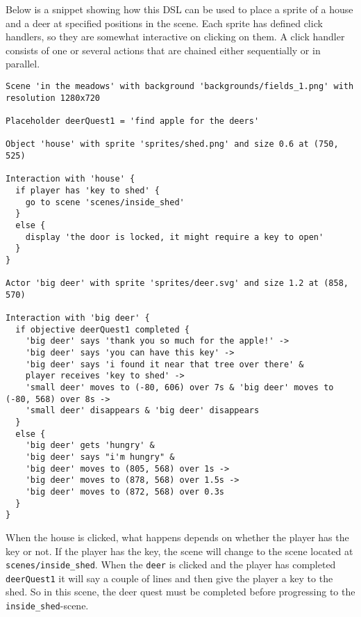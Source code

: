Below is a snippet showing how this \ac{DSL} can be used to place a sprite of a house and a deer at specified positions in the scene. Each sprite has defined click handlers, so they are somewhat interactive on clicking on them. A click handler consists of one or several actions that are chained either sequentially or in parallel.

\begin{lstlisting}
Scene 'in the meadows' with background 'backgrounds/fields_1.png' with resolution 1280x720

Placeholder deerQuest1 = 'find apple for the deers'

Object 'house' with sprite 'sprites/shed.png' and size 0.6 at (750, 525)

Interaction with 'house' {
  if player has 'key to shed' {
    go to scene 'scenes/inside_shed'
  }
  else {
    display 'the door is locked, it might require a key to open'
  }
}

Actor 'big deer' with sprite 'sprites/deer.svg' and size 1.2 at (858, 570)

Interaction with 'big deer' {
  if objective deerQuest1 completed {
    'big deer' says 'thank you so much for the apple!' ->
    'big deer' says 'you can have this key' ->
    'big deer' says 'i found it near that tree over there' &
    player receives 'key to shed' ->
    'small deer' moves to (-80, 606) over 7s & 'big deer' moves to (-80, 568) over 8s ->
    'small deer' disappears & 'big deer' disappears
  }
  else {
    'big deer' gets 'hungry' &
    'big deer' says "i'm hungry" &
    'big deer' moves to (805, 568) over 1s ->
    'big deer' moves to (878, 568) over 1.5s ->
    'big deer' moves to (872, 568) over 0.3s
  }
}
\end{lstlisting}

When the house is clicked, what happens depends on whether the player has the key or not. If the player has the key, the scene will change to the scene located at \texttt{scenes/inside\_shed}.
When the \texttt{deer} is clicked and the player has completed \texttt{deerQuest1} it will say a couple of lines and then give the player a key to the shed. So in this scene, the deer quest must be completed before progressing to the \texttt{inside\_shed}-scene.